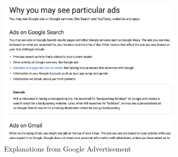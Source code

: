         \begin{figure}[H]
            \centering
            \captionsetup{justification=centering}
            \begin{mdframed}
                \includegraphics[width=0.8\textwidth]{img/googleAd3-1}
            \end{mdframed}
            \caption{Explanations from Google Advertisement\cite{googleAd3}}
            \label{img:googleAd3}
        \end{figure}
